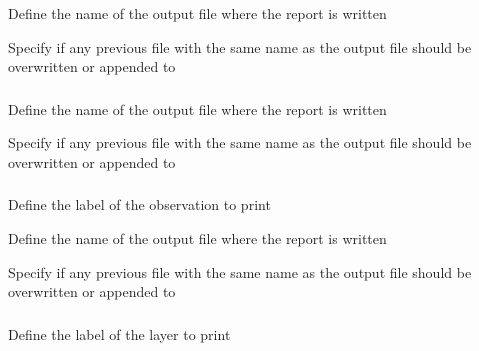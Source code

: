  {Define the name of the output file where the report is written}

 {Specify if any previous file with the same name as the output file should be overwritten or appended to}

\subsubsection[Print the Objective function values]{}

 {Define the name of the output file where the report is written}

 {Specify if any previous file with the same name as the output file should be overwritten or appended to}

\subsubsection[Print a a summary of the an observation, including fits, and residuals]{}

 {Define the label of the observation to print}

 {Define the name of the output file where the report is written}

 {Specify if any previous file with the same name as the output file should be overwritten or appended to}

\subsubsection[Print a layer]{}

 {Define the label of the layer to print}

